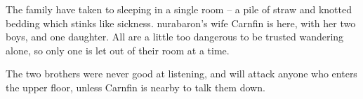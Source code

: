 
The family have taken to sleeping in a single room -- a pile of straw and knotted bedding which stinks like sickness.
\Gls{nurabaron}'s wife Carnfin is here, with her two boys, and one daughter.
All are a little too dangerous to be trusted wandering alone, so only one is let out of their room at a time.

The two brothers were never good at listening, and will attack anyone who enters the upper floor, unless Carnfin is nearby to talk them down.


